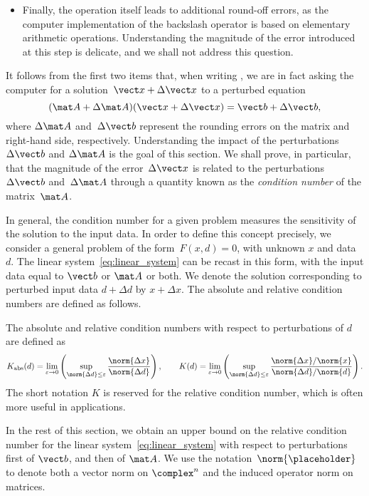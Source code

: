 \begin{example}
\begin{itemize}
    \item
        Finally, the operation  itself leads to additional round-off errors,
        as the computer implementation of the backslash operator is based on elementary arithmetic operations.
        Understanding the magnitude of the error introduced at this step is delicate,
        and we shall not address this question.
\end{itemize}
It follows from the first two items that, when writing ,
we are in fact asking the computer for a solution~$\vect x + \Delta \vect x$ to a perturbed equation
\[
    (\mat A + \Delta \mat A) (\vect x + \Delta \vect x) = \vect b + \Delta \vect b,
\]
where $\Delta \mat A$ and~$\Delta \vect b$ represent the rounding errors on the matrix and right-hand side, respectively.
Understanding the impact of the perturbations~$\Delta \vect b$ and $\Delta \mat A$ is the goal of this section.
We shall prove,
in particular,
that the magnitude of the error~$\Delta \vect x$ is related to the perturbations~$\Delta \vect b$ and~$\Delta \mat A$ through a quantity known as the \emph{condition number} of the matrix~$\mat A$.
\end{example}

In general, the condition number for a given problem measures the sensitivity of the solution to the input data.
In order to define this concept precisely,
we consider a general problem of the form~$F(x, d) = 0$,
with unknown $x$ and data $d$.
The linear system~\eqref{eq:linear_system} can be recast in this form,
with the input data equal to $\vect b$ or $\mat A$ or both.
We denote the solution corresponding to perturbed input data $d + \Delta d$ by $x + \Delta x$.
The absolute and relative condition numbers are defined as follows.

\begin{definition}
    [Condition number for the problem $F(x, d) = 0$]
    The absolute and relative condition numbers with respect to perturbations of $d$ are defined as
    \[
        K_{\rm abs}(d) = \lim_{\varepsilon \to 0} \left( \sup_{\norm{\Delta d} \leq \varepsilon} \frac{\norm{\Delta x}}{\norm{\Delta d}} \right),
        \qquad
        K(d) = \lim_{\varepsilon \to 0} \left( \sup_{\norm{\Delta d} \leq \varepsilon} \frac{\norm{\Delta x} / \norm{x}}{\norm{\Delta d} / \norm{d}} \right).
    \]
    The short notation $K$ is reserved for the relative condition number,
    which is often more useful in applications.
\end{definition}

In the rest of this section,
we obtain an upper bound on the relative condition number for the linear system~\eqref{eq:linear_system} with respect to perturbations first of $\vect b$,
and then of $\mat A$.
We use the notation~$\norm{\placeholder}$ to denote both a vector norm on $\complex^n$ and the induced operator norm on matrices.

